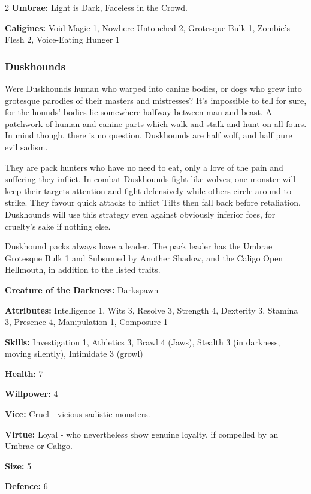 \begin{multicols}{2}
\noindent \textbf{Umbrae:} Light is Dark, Faceless in the Crowd.

\noindent \textbf{Caligines:} Void Magic 1, Nowhere Untouched 2, Grotesque Bulk 1, Zombie's Flesh 2, Voice-Eating Hunger 1

\subsubsection*{Duskhounds}

Were Duskhounds human who warped into canine bodies, or dogs who grew into grotesque parodies of their masters and mistresses? It’s impossible to tell for sure, for the hounds’ bodies lie somewhere halfway between man and beast. A patchwork of human and canine parts which walk and stalk and hunt on all fours. In mind though, there is no question. Duskhounds are half wolf, and half pure evil sadism. 

They are pack hunters who have no need to eat, only a love of the pain and suffering they inflict. In combat Duskhounds fight like wolves; one monster will keep their targets attention and fight defensively while others circle around to strike. They favour quick attacks to inflict Tilts then fall back before retaliation. Duskhounds will use this strategy even against obviously inferior foes, for cruelty’s sake if nothing else.

Duskhound packs always have a leader. The pack leader has the Umbrae Grotesque Bulk 1 and Subsumed by Another Shadow, and the Caligo Open Hellmouth, in addition to the listed traits.

\noindent \textbf{Creature of the Darkness:} Darkspawn

\noindent \textbf{Attributes:} Intelligence 1, Wits 3, Resolve 3, Strength 4, Dexterity 3, Stamina 3, Presence 4, Manipulation 1, Composure 1

\noindent \textbf{Skills:} Investigation 1, Athletics 3, Brawl 4 (Jaws), Stealth 3 (in darkness, moving silently), Intimidate 3 (growl)

\noindent \textbf{Health:} 7

\noindent \textbf{Willpower:} 4

\noindent \textbf{Vice:} Cruel - vicious sadistic monsters.

\noindent \textbf{Virtue:} Loyal - who nevertheless show genuine loyalty, if compelled by an Umbrae or Caligo.

\noindent \textbf{Size:} 5

\noindent \textbf{Defence:} 6


\end{multicols}
